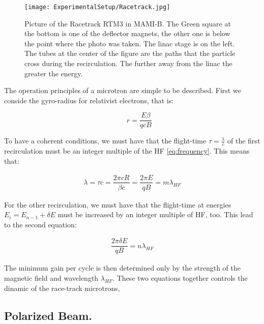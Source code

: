 \begin{figure}[hbtp]
\centering
\texttt{[image: ExperimentalSetup/Racetrack.jpg]}
\caption{Picture of the Racetrack RTM3 in MAMI-B. The Green square at the bottom is one of the deflector magnets, the other one is below the point where the photo was taken. The linac stage is on the left. The tubes at the center of the figure are the paths that the particle cross during the recirculation. The further away from the linac the greater the energy.}
\end{figure}

The operation principles of a microtron are simple to be described. First we conside the gyro-radius for relativist electrons, that is:

\begin{equation}
\qquad r = \dfrac{E \beta}{qcB}
\end{equation}

To have a coherent conditions, we must have that the flight-time $\tau = \frac{\lambda}{c}$ of the first recirculation must be an integer multiple of the HF \ref{eq:frequency}. This means that:

\begin{align*}
\lambda = \tau c =\dfrac{ 2 \pi c R }{\beta c} = \dfrac{2 \pi E}{q B} = m \lambda_{HF}
\end{align*}

For the other recirculation, we must have that the flight-time at energies $E_{i} = E_{n-1} + \delta E$ must be increased by an integer multiple of HF, too. This lead to the second equation:

\begin{align*}
\dfrac{2 \pi \delta E}{q B} = n \lambda_{HF}
\end{align*}

The minimum gain per cycle is then determined only by the strength of the magnetic field and wavelength $\lambda_{HF}$. These two equations together controls the dinamic of the race-track microtrons,

\subsection{Polarized Beam.}
 \medskip


